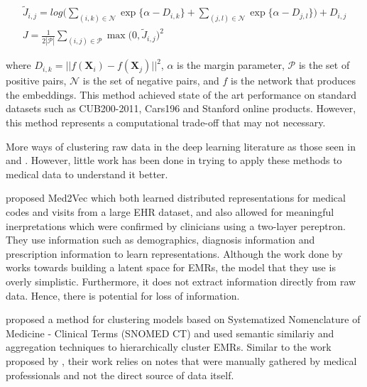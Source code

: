 \begin{equation}
  \label{eq:lifted_structure_loss}
  \begin{gathered}
\tilde{J}_{i,j} = log \bigg( \sum_{(i,k) \in \mathcal{N}} \exp\{ \alpha - D_{i,k} \} + \sum_{(j,l) \in \mathcal{N}} \exp\{\alpha - D_{j, l}\} \bigg) + D_{i, j}
\\
J = \frac{1}{2 |\mathcal{P}|} \sum_{(i,j) \in \mathcal{P}} \max \Big( 0, \tilde{J}_{i,j}\Big)^2
  \end{gathered}
\end{equation}

\noindent
where $D_{i,k} = || f(\mathbf{X}_i) - f(\mathbf{X}_j)||^2$, $\alpha$ is the margin parameter, $\mathcal{P}$ is the set of positive pairs, $\mathcal{N}$ is the set of negative pairs, and $f$ is the network that produces the embeddings. This method achieved state of the art performance on standard datasets such as CUB200-2011, Cars196 and Stanford online products. However, this method represents a computational trade-off that may not necessary.

More ways of clustering raw data in the deep learning literature as those seen in \citet{jule, distknn, imgsimilarity} and \citet{errorprop}. However, little work has been done in trying to apply these methods to medical data to understand it better. 



\citet{mlprepresentation} proposed Med2Vec which both learned distributed representations for medical codes and visits from a large EHR dataset, and also allowed for meaningful inerpretations which were confirmed by clinicians using a two-layer pereptron. They use information such as demographics, diagnosis information and prescription information to learn representations. Although the work done by \citet{mlprepresentation} works towards building a latent space for EMRs,  the model that they use is overly simplistic. Furthermore, it does not extract information directly from raw data. Hence, there is potential for loss of information.

\citet{goeg2015clustering} proposed a method for clustering models based on Systematized Nomenclature of Medicine - Clinical Terms (SNOMED CT) and used semantic similariy and aggregation techniques to hierarchically cluster EMRs. Similar to the work proposed by \citet{mlprepresentation}, their work relies on notes that were manually gathered by medical professionals and not the direct source of data itself. 

